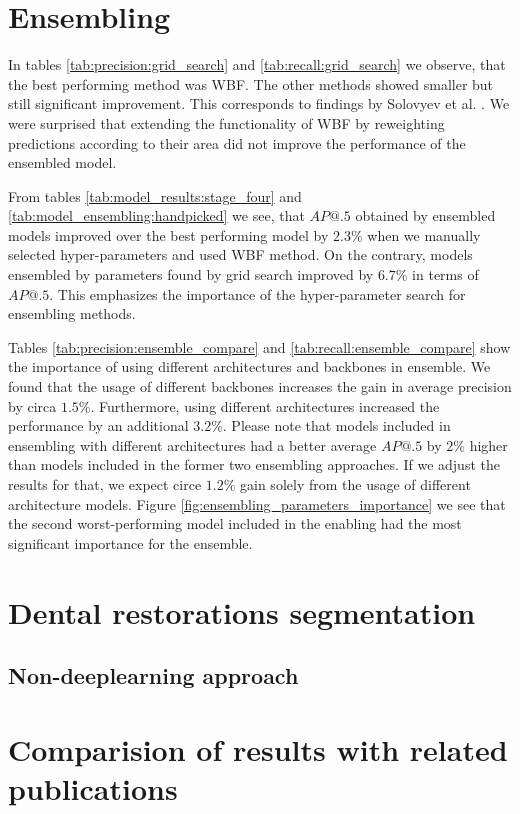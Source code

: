 \section{Ensembling}
In tables \ref{tab:precision:grid_search} and \ref{tab:recall:grid_search} we observe, that the best performing method was WBF. The other methods showed smaller but still significant improvement. This corresponds to findings by Solovyev et al. \cite{Solovyev2019}. We were surprised that extending the functionality of WBF by reweighting predictions according to their area did not improve the performance of the ensembled model.

From tables \ref{tab:model_results:stage_four} and \ref{tab:model_ensembling:handpicked} we see, that $AP@.5$ obtained by ensembled models improved over the best performing model by $2.3\%$ when we manually selected hyper-parameters and used WBF method. On the contrary, models ensembled by parameters found by grid search improved by $6.7\%$ in terms of $AP@.5$. This emphasizes the importance of the hyper-parameter search for ensembling methods.

Tables \ref{tab:precision:ensemble_compare} and \ref{tab:recall:ensemble_compare} show the importance of using different architectures and backbones in ensemble.
We found that the usage of different backbones increases the gain in average precision by circa $1.5\%$. Furthermore, using different architectures increased the performance by an additional $3.2\%$. Please note that models included in ensembling with different architectures had a better average $AP@.5$ by $2\%$ higher than models included in the former two ensembling approaches. If we adjust the results for that, we expect circe $1.2\%$ gain solely from the usage of different architecture models. Figure \ref{fig:ensembling_parameters_importance} we see that the second worst-performing model included in the enabling had the most significant importance for the ensemble.


\section{Dental restorations segmentation}
\subsection{Non-deeplearning approach}





\section{Comparision of results with related publications}

